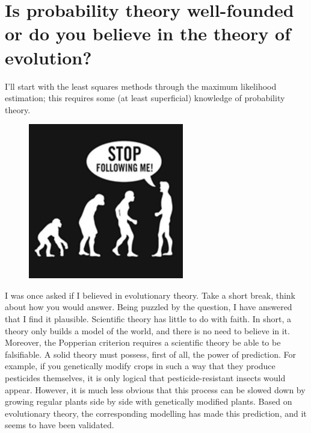 \documentclass{article}
\begin{document}
\section{Is probability theory well-founded or do you believe in the theory of evolution?}

I’ll start with the least squares methods through the maximum likelihood estimation;
this requires some (at least superficial) knowledge of probability theory. 


\begin{figure}
\includegraphics[width=\linewidth]{stop-following-me}
\end{figure}
I was once asked if I believed in evolutionary theory. 
Take a short break, think about how you would answer.
Being puzzled by the question, I have answered that I find it plausible. 
Scientific theory has little to do with faith.
In short, a theory only builds a model of the world, and there is no need to believe in it.
Moreover, the Popperian criterion\cite{} requires a scientific theory be able to be falsifiable. 
A solid theory must possess, first of all, the power of prediction.
For example, if you genetically modify crops in such a way that they produce pesticides themselves, 
it is only logical that pesticide-resistant insects would appear. 
However, it is much less obvious that this process can be slowed down by growing regular plants side by side with genetically modified plants. 
Based on evolutionary theory, the corresponding modelling has made this prediction\cite{}, and it seems to have been validated\cite{}.
\end{document}
